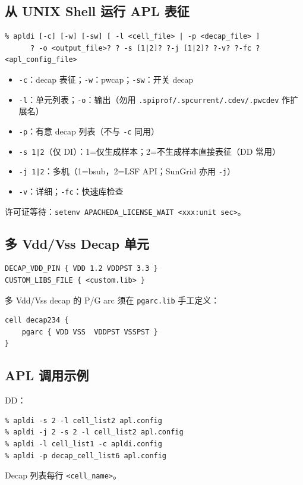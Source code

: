 \subsection{从 UNIX Shell 运行 APL 表征}
\begin{lstlisting}
% apldi [-c] [-w] [-sw] [ -l <cell_file> | -p <decap_file> ]
      ? -o <output_file>? ? -s [1|2]? ?-j [1|2]? ?-v? ?-fc ? <apl_config_file>
\end{lstlisting}

\begin{itemize}
  \item \texttt{-c}：decap 表征；\texttt{-w}：pwcap；\texttt{-sw}：开关 decap
  \item \texttt{-l}：单元列表；\texttt{-o}：输出（勿用 \texttt{.spiprof/.spcurrent/.cdev/.pwcdev} 作扩展名）
  \item \texttt{-p}：有意 decap 列表（不与 \texttt{-c} 同用）
  \item \texttt{-s 1|2}（仅 DI）：1=仅生成样本；2=不生成样本直接表征（DD 常用）
  \item \texttt{-j 1|2}：多机（1=bsub，2=LSF API；SunGrid 亦用 \texttt{-j}）
  \item \texttt{-v}：详细；\texttt{-fc}：快速库检查
\end{itemize}

许可证等待：\texttt{setenv APACHEDA\_LICENSE\_WAIT <xxx:unit sec>}。

\subsection{多 Vdd/Vss Decap 单元}
\begin{lstlisting}
DECAP_VDD_PIN { VDD 1.2 VDDPST 3.3 }
CUSTOM_LIBS_FILE { <custom.lib> }
\end{lstlisting}
多 Vdd/Vss decap 的 P/G arc 须在 \texttt{pgarc.lib} 手工定义：
\begin{lstlisting}
cell decap234 {
    pgarc { VDD VSS  VDDPST VSSPST }
}
\end{lstlisting}

\subsection{APL 调用示例}
DD：
\begin{lstlisting}
% apldi -s 2 -l cell_list2 apl.config
% apldi -j 2 -s 2 -l cell_list2 apl.config
% apldi -l cell_list1 -c apldi.config
% apldi -p decap_cell_list6 apl.config
\end{lstlisting}
Decap 列表每行 \texttt{<cell\_name>}。

